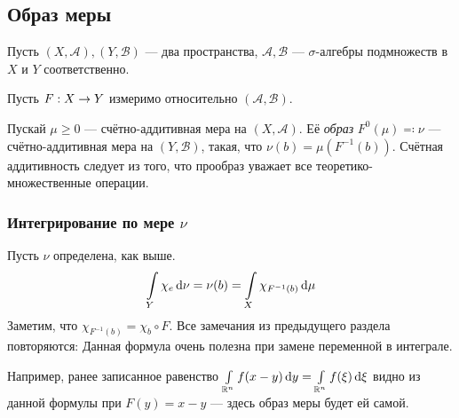\documentclass[a4paper]{report}
\begin{document}
    \subsection{Образ меры}
    Пусть $(X, \mathcal{A}), (Y, \mathcal{B})$ --- два пространства, $\mathcal{A}, \mathcal{B}$ --- $\sigma$-алгебры подмножеств в $X$ и $Y$ соответственно.

    Пусть $F: X \rightarrow Y$ измеримо относительно $(\mathcal{A}, \mathcal{B})$.

    Пускай  $\mu \ge 0$ --- счётно-аддитивная мера на $(X, \mathcal{A})$.
    Её \emph{образ} $F^0(\mu) \eqqcolon \nu$ --- счётно-аддитивная мера на $(Y, \mathcal{B})$, такая, что $\nu(b) = \mu(F^{-1}(b))$.
    Счётная аддитивность следует из того, что прообраз уважает все теоретико-множественные операции.

    \subsubsection{Интегрирование по мере $\nu$}
    Пусть $\nu$ определена, как выше.
    \[\int\limits_{Y}\chi_e\operatorname{d}\!\nu = \nu(b) = \int\limits_{X}\chi_{F^{-1}(b)}\operatorname{d}\!\mu\]
    Заметим, что $\chi_{F^{-1}(b)} = \chi_b \circ F$.
    Все замечания из предыдущего раздела повторяются:
    Данная формула очень полезна при замене переменной в интеграле.

    Например, ранее записанное равенство $\int\limits_{\mathbb{R}^n}f(x - y)\operatorname{d}\! y = \int\limits_{\mathbb{R}^n}f(\xi)\operatorname{d}\!\xi$ видно из данной формулы при $F(y) = x - y$ --- здесь образ меры будет ей самой.
\end{document}
